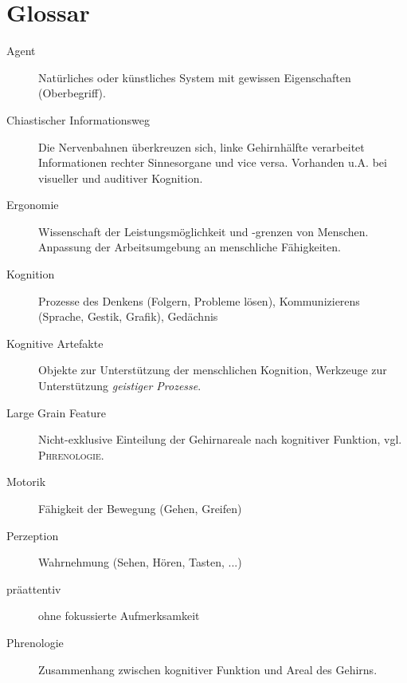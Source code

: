 \section{Glossar}

\begin{description}

\item[Agent] Natürliches oder künstliches System mit gewissen Eigenschaften (Oberbegriff).

\item[Chiastischer Informationsweg] Die Nervenbahnen überkreuzen sich, linke Gehirnhälfte
    verarbeitet Informationen rechter Sinnesorgane und vice versa. Vorhanden u.A. bei
    visueller und auditiver Kognition.

\item[Ergonomie] Wissenschaft der Leistungsmöglichkeit und -grenzen von Menschen. Anpassung
    der Arbeitsumgebung an menschliche Fähigkeiten.

\item[Kognition] Prozesse des Denkens (Folgern, Probleme lösen),
    Kommunizierens (Sprache, Gestik, Grafik), Gedächnis

\item[Kognitive Artefakte] Objekte zur Unterstützung der menschlichen Kognition,
    Werkzeuge zur Unterstützung \emph{geistiger Prozesse}.

\item[Large Grain Feature] Nicht-exklusive Einteilung der Gehirnareale nach kognitiver
    Funktion, vgl. \textsc{Phrenologie}.

\item[Motorik] Fähigkeit der Bewegung (Gehen, Greifen)

\item[Perzeption] Wahrnehmung (Sehen, Hören, Tasten, ...)

\item[präattentiv] ohne fokussierte Aufmerksamkeit

\item[Phrenologie] Zusammenhang zwischen kognitiver Funktion und Areal des Gehirns.

\end{description}
